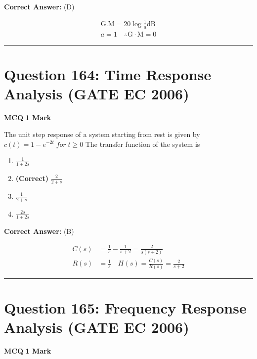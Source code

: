 \documentclass[11pt,a4paper]{article}
\begin{document}
\noindent \textbf{Correct Answer:} (D)

\begin{tcolorbox}[solbox, title=Detailed Solution -- Question 163]
\[
\begin{array}{l} \mathrm{G.M}=20 \log \frac{1}{a} \mathrm{dB} \\ a=1 \quad \therefore \mathrm{G} \cdot \mathrm{M}=0 \end{array}
\]
\end{tcolorbox}

\vspace{1.5em}
\hrule
\vspace{1.5em}

\section*{Question 164: Time Response Analysis (GATE EC 2006)}
\noindent \textbf{\color{primary}MCQ} \hfill \textbf{\color{secondary}1 Mark}


\noindent The unit step response of a system starting from rest is given by 
 $c(t)=1-e^{-2t} \; for \;  t\geq 0$ 
The transfer function of the system is


\begin{enumerate}[label=(\Alph*)]
    \item $\frac{1}{1+2s}$
    \item \textbf{(Correct)} $\frac{2}{2+s}$
    \item $\frac{1}{2+s}$
    \item $\frac{2s}{1+2s}$
\end{enumerate}

\noindent \textbf{Correct Answer:} (B)

\begin{tcolorbox}[solbox, title=Detailed Solution -- Question 164]
\[
\begin{aligned} C(s)&=\frac{1}{s}-\frac{1}{s+2}=\frac{2}{s(s+2)} \\ R(s)&=\frac{1}{s} \quad H(s)=\frac{C(s)}{R(s)}=\frac{2}{s+2} \end{aligned}
\]
\end{tcolorbox}

\vspace{1.5em}
\hrule
\vspace{1.5em}

\section*{Question 165: Frequency Response Analysis (GATE EC 2006)}
\noindent \textbf{\color{primary}MCQ} \hfill \textbf{\color{secondary}1 Mark}
\end{document}
